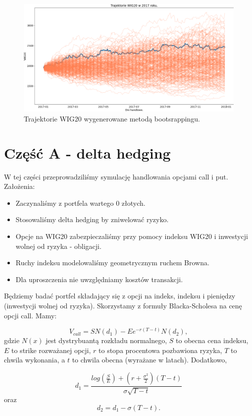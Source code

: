 \documentclass[12pt]{article}
\begin{document}
\begin{figure}[htp]
    \centering
    \includegraphics[width=\textwidth,height=\textheight,keepaspectratio]{bootstrapping.png}
    \caption{Trajektorie WIG20 wygenerowane metodą bootsrappingu.}
    \label{fig:bootstrap}
\end{figure}

\newpage
\section{Część A - delta hedging}
W tej części przeprowadziliśmy symulację handlowania opcjami call i put. Założenia:
\begin{itemize}
    \item Zaczynaliśmy z portfela wartego 0 złotych. 
    \item Stosowaliśmy delta hedging by zniwelować ryzyko. 
    \item Opcje na WIG20 zabezpieczaliśmy przy pomocy indeksu WIG20 i inwestycji wolnej od ryzyka - obligacji. 
    \item Ruchy indeksu modelowaliśmy geometrycznym ruchem Browna. 
    \item Dla uproszczenia nie uwzględniamy kosztów transakcji. 
\end{itemize} 

Będziemy badać portfel składający się z opcji na indeks, indeksu i pieniędzy (inwestycji wolnej od ryzyka). Skorzystamy z formuły Blacka-Scholesa na cenę opcji call. Mamy:

$$V_{call}=SN(d_1)-Ee^{-r(T-t)}N(d_2),$$
gdzie $N(x)$ jest dystrybuantą rozkładu normalnego, $S$ to obecna cena indeksu, $E$ to strike rozważanej opcji, $r$ to stopa procentowa pozbawiona ryzyka, $T$ to chwila wykonania, a $t$ to chwila obecna (wyrażane w latach). Dodatkowo,

$$d_1=\frac{log(\frac{S}{E})+(r+\frac{\sigma^2}{2})(T-t)} {\sigma \sqrt{T-t}}$$ oraz $$d_2=d_1-\sigma(T-t).$$
\end{document}

